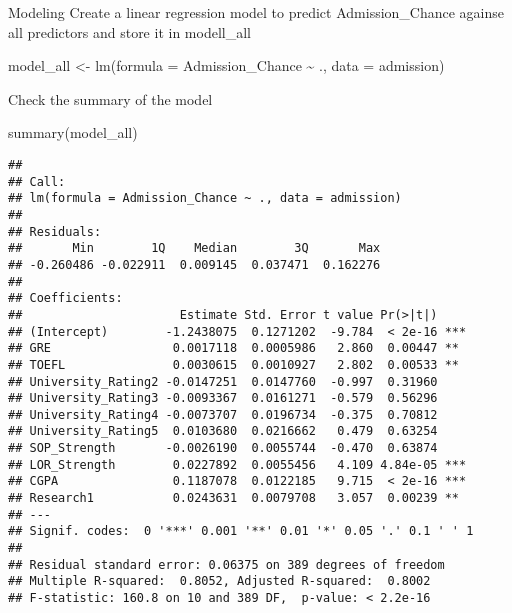\documentclass[
  ignorenonframetext,
]{beamer}
\newenvironment{Shaded}{\begin{snugshade}}{\end{snugshade}}
\newcommand{\AttributeTok}[1]{\textcolor[rgb]{0.77,0.63,0.00}{#1}}
\newcommand{\FunctionTok}[1]{\textcolor[rgb]{0.00,0.00,0.00}{#1}}
\newcommand{\NormalTok}[1]{#1}
\newcommand{\OtherTok}[1]{\textcolor[rgb]{0.56,0.35,0.01}{#1}}
\newcommand{\SpecialCharTok}[1]{\textcolor[rgb]{0.00,0.00,0.00}{#1}}
\begin{document}
\begin{frame}[fragile]{Modeling}
\protect\hypertarget{modeling}{}
Create a linear regression model to predict Admission\_Chance againse
all predictors and store it in modell\_all

\begin{Shaded}
\begin{Highlighting}[]
\NormalTok{model\_all }\OtherTok{\textless{}{-}} \FunctionTok{lm}\NormalTok{(}\AttributeTok{formula =}\NormalTok{ Admission\_Chance }\SpecialCharTok{\textasciitilde{}}\NormalTok{ ., }\AttributeTok{data =}\NormalTok{ admission)}
\end{Highlighting}
\end{Shaded}

Check the summary of the model

\begin{Shaded}
\begin{Highlighting}[]
\FunctionTok{summary}\NormalTok{(model\_all)}
\end{Highlighting}
\end{Shaded}

\begin{verbatim}
## 
## Call:
## lm(formula = Admission_Chance ~ ., data = admission)
## 
## Residuals:
##       Min        1Q    Median        3Q       Max 
## -0.260486 -0.022911  0.009145  0.037471  0.162276 
## 
## Coefficients:
##                      Estimate Std. Error t value Pr(>|t|)    
## (Intercept)        -1.2438075  0.1271202  -9.784  < 2e-16 ***
## GRE                 0.0017118  0.0005986   2.860  0.00447 ** 
## TOEFL               0.0030615  0.0010927   2.802  0.00533 ** 
## University_Rating2 -0.0147251  0.0147760  -0.997  0.31960    
## University_Rating3 -0.0093367  0.0161271  -0.579  0.56296    
## University_Rating4 -0.0073707  0.0196734  -0.375  0.70812    
## University_Rating5  0.0103680  0.0216662   0.479  0.63254    
## SOP_Strength       -0.0026190  0.0055744  -0.470  0.63874    
## LOR_Strength        0.0227892  0.0055456   4.109 4.84e-05 ***
## CGPA                0.1187078  0.0122185   9.715  < 2e-16 ***
## Research1           0.0243631  0.0079708   3.057  0.00239 ** 
## ---
## Signif. codes:  0 '***' 0.001 '**' 0.01 '*' 0.05 '.' 0.1 ' ' 1
## 
## Residual standard error: 0.06375 on 389 degrees of freedom
## Multiple R-squared:  0.8052, Adjusted R-squared:  0.8002 
## F-statistic: 160.8 on 10 and 389 DF,  p-value: < 2.2e-16
\end{verbatim}
\end{frame}
\end{document}

